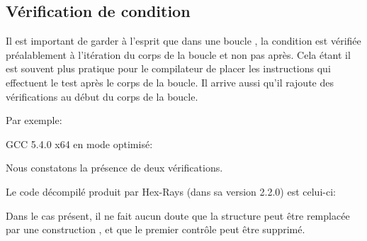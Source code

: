 ﻿\subsection{Vérification de condition}

Il est important de garder à l'esprit que dans une boucle , la condition est vérifiée 
préalablement à l'itération du corps de la boucle et non pas après. Cela étant il est souvent plus 
pratique pour le compilateur de placer les instructions qui effectuent le test après le corps de 
la boucle. Il arrive aussi qu'il rajoute des vérifications au début du corps de la boucle.

Par exemple:



GCC 5.4.0 x64 en mode optimisé:



Nous constatons la présence de deux vérifications.

Le code décompilé produit par Hex-Rays (dans sa version 2.2.0) est celui-ci:



Dans le cas présent, il ne fait aucun doute que la structure  peut être remplacée par 
une construction , et que le premier contrôle peut être supprimé.

